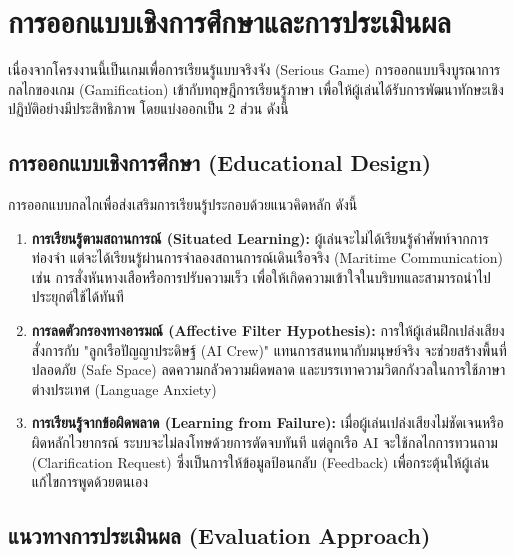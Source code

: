 
\section{การออกแบบเชิงการศึกษาและการประเมินผล}

เนื่องจากโครงงานนี้เป็นเกมเพื่อการเรียนรู้แบบจริงจัง (Serious Game) การออกแบบจึงบูรณาการกลไกของเกม (Gamification) เข้ากับทฤษฎีการเรียนรู้ภาษา เพื่อให้ผู้เล่นได้รับการพัฒนาทักษะเชิงปฏิบัติอย่างมีประสิทธิภาพ\cite{sadigzade2025} โดยแบ่งออกเป็น 2 ส่วน ดังนี้

\subsection{การออกแบบเชิงการศึกษา (Educational Design)}

การออกแบบกลไกเพื่อส่งเสริมการเรียนรู้ประกอบด้วยแนวคิดหลัก ดังนี้

\begin{enumerate}[label=\arabic*)]
    \item \textbf{การเรียนรู้ตามสถานการณ์ (Situated Learning):} ผู้เล่นจะไม่ได้เรียนรู้คำศัพท์จากการท่องจำ แต่จะได้เรียนรู้ผ่านการจำลองสถานการณ์เดินเรือจริง (Maritime Communication) เช่น การสั่งหันหางเสือหรือการปรับความเร็ว เพื่อให้เกิดความเข้าใจในบริบทและสามารถนำไปประยุกต์ใช้ได้ทันที\cite{sadigzade2025}
    \item \textbf{การลดตัวกรองทางอารมณ์ (Affective Filter Hypothesis):} การให้ผู้เล่นฝึกเปล่งเสียงสั่งการกับ "ลูกเรือปัญญาประดิษฐ์ (AI Crew)" แทนการสนทนากับมนุษย์จริง จะช่วยสร้างพื้นที่ปลอดภัย (Safe Space) ลดความกลัวความผิดพลาด และบรรเทาความวิตกกังวลในการใช้ภาษาต่างประเทศ (Language Anxiety)\cite{sadigzade2025}
    \item \textbf{การเรียนรู้จากข้อผิดพลาด (Learning from Failure):} เมื่อผู้เล่นเปล่งเสียงไม่ชัดเจนหรือผิดหลักไวยากรณ์ ระบบจะไม่ลงโทษด้วยการตัดจบทันที แต่ลูกเรือ AI จะใช้กลไกการทวนถาม (Clarification Request) ซึ่งเป็นการให้ข้อมูลป้อนกลับ (Feedback) เพื่อกระตุ้นให้ผู้เล่นแก้ไขการพูดด้วยตนเอง\cite{zargham2024}
\end{enumerate}

\subsection{แนวทางการประเมินผล (Evaluation Approach)}

